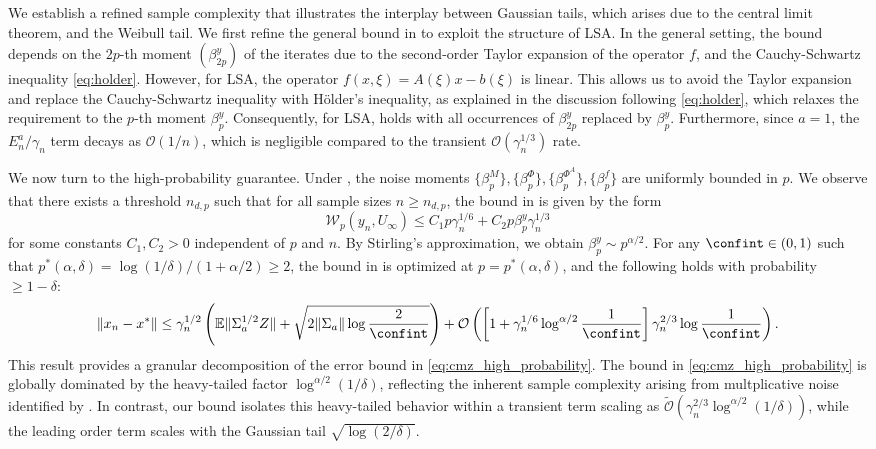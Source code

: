\documentclass[11pt]{article}
\begin{document}
We establish a refined sample complexity that illustrates the interplay between Gaussian tails, which arises due to the central limit theorem, and the Weibull tail.
We first refine the general bound in  to exploit the structure of LSA. 
In the general \nonlinear setting, the bound depends on the $2p$-th moment $(\beta_{2p}^y)$ of the iterates due to the second-order Taylor expansion of the operator $f$, and the Cauchy-Schwartz inequality \eqref{eq:holder}. 
However, for LSA, the operator $f(x, \xi) = A(\xi) x - b(\xi)$ is linear. 
This allows us to avoid the Taylor expansion and replace the Cauchy-Schwartz inequality with H\"{o}lder's inequality, as explained in the discussion following \eqref{eq:holder}, which relaxes the requirement to the $p$-th moment $\beta_p^y$. 
Consequently, for LSA,  holds with all occurrences of $\beta_{2p}^y$ replaced by $\beta_p^y$. 
Furthermore, since $a = 1$, the $E_n^a/\gamma_n$ term decays as $\mathcal{O}(1/n)$, which is negligible compared to the transient $\mathcal{O}(\gamma_n^{1/3})$ rate. 





We now turn to the high-probability guarantee. 
Under , the noise moments $\{\beta_p^M\}, \{\beta_p^\Phi\}, \{\beta_p^{\Phi^A}\}, \{\beta_p^f\}$ are uniformly bounded in $p$. 
We observe that there exists a threshold $n_{d, p}$ such that for all sample sizes $n \geq n_{d, p}$, the bound in  is given by the form
\begin{equation}\label{eq:thm1_application_linear}
    \mathcal{W}_p (y_n, U_\infty) 
    \leq
    C_1 p \gamma_n^{1/6} + C_2 p \beta_p^y \gamma_n^{1/3}
\end{equation}
for some constants $C_1, C_2 > 0$ independent of $p$ and $n$. 
By Stirling's approximation, we obtain $\beta_p^y \sim p^{\alpha/2}$. 
For any $\confint \in (0, 1)$ such that $p^*(\alpha, \delta) = \log (1/\delta)/(1+\alpha/2) \geq 2$, the bound in  is optimized at $p = p^*(\alpha, \delta)$, and the following holds with probability $\geq 1 - \delta$:
\begin{align*}
    \lVert x_n - x^* \rVert\leq 
    \gamma_n^{1/2}\left( \mathbb{E}\lVert \Sigma_a^{1/2} Z \rVert 
    + \sqrt{2  \lVert \Sigma_a \rVert \log \frac{2}{\confint}} \right) + 
    \mathcal{O}\left( \left[1+ \gamma_n^{1/6}\log^{\alpha/2} \frac{1}{\confint}  \right]\gamma_n^{2/3}\log \frac{1}{\confint}
    \right)
    .
\end{align*}
This result provides a granular decomposition of the error bound in \eqref{eq:cmz_high_probability}. 
The bound in \eqref{eq:cmz_high_probability} is globally dominated by the heavy-tailed factor $\log^{\alpha/2} (1/\delta)$, reflecting the inherent sample complexity arising from multplicative noise identified by \citet{chen_contractive_concentration}. 
In contrast, our bound isolates this heavy-tailed behavior within a transient term scaling as $\tilde{\mathcal{O}}(\gamma_n^{2/3} \log^{\alpha/2} (1/\delta))$, while the leading order term scales with the Gaussian tail $\sqrt{\log (2/\delta)}$. 
\end{document}

